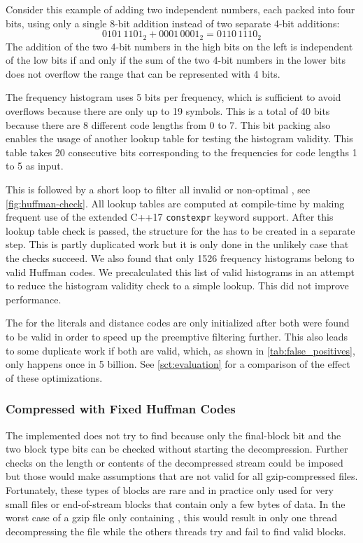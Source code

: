 Consider this example of adding two independent numbers, each packed into four bits, using only a single 8-bit addition instead of two separate 4-bit additions:
\begin{equation*}
    0101\,1101_2 + 0001\,0001_2 = 0110\,1110_2
\end{equation*}
The addition of the two 4-bit numbers in the high bits on the left is independent of the low bits if and only if the sum of the two 4-bit numbers in the lower bits does not overflow the range that can be represented with 4 bits.

The frequency histogram uses 5 bits per frequency, which is sufficient to avoid overflows because there are only up to 19 \precode symbols.
This is a total of 40 bits because there are 8 different code lengths from 0 to 7.
This bit packing also enables the usage of another lookup table for testing the histogram validity.
This table takes 20 consecutive bits corresponding to the frequencies for code lengths 1 to 5 as input.

This is followed by a short loop to filter all invalid or non-optimal \huffcodes, see \cref{fig:huffman-check}.
All lookup tables are computed at compile-time by making frequent use of the extended C++17 \texttt{constexpr} keyword support.
After this lookup table check is passed, the \huffcode structure for the \precode has to be created in a separate step.
This is partly duplicated work but it is only done in the unlikely case that the checks succeed.
We also found that only 1526 \precode frequency histograms belong to valid Huffman codes.
We precalculated this list of valid histograms in an attempt to reduce the histogram validity check to a simple lookup.
This did not improve performance.

The \huffcodes for the  literals and distance codes are only initialized after both were found to be valid in order to speed up the preemptive filtering further.
This also leads to some duplicate work if both \huffcodes are valid, which, as shown in \cref{tab:false_positives}, only happens once in 5 billion.
See \cref{sct:evaluation} for a comparison of the effect of these optimizations.


\subsubsection{Compressed with Fixed Huffman Codes}

The implemented \blockfinder does not try to find \fixedblocks because only the final-block bit and the two block type bits can be checked without starting the decompression.
Further checks on the length or contents of the decompressed stream could be imposed but those would make assumptions that are not valid for all gzip-compressed files.
Fortunately, these types of blocks are rare and in practice only used for very small files or end-of-stream blocks that contain only a few bytes of data.
In the worst case of a gzip file only containing \fixedblocks, this would result in only one thread decompressing the file while the others threads try and fail to find valid blocks.



